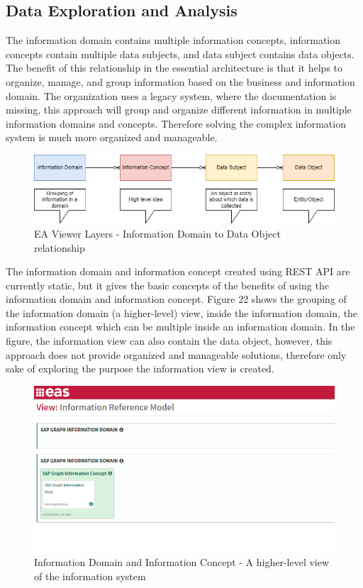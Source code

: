 \documentclass{article}
\begin{document}
\subsection{Data Exploration and Analysis}

The information domain contains multiple information concepts, information concepts contain multiple data subjects, and data subject contains data objects. The benefit of this relationship in the essential architecture is that it helps to organize, manage, and group information based on the business and information domain. The organization uses a legacy system, where the documentation is missing, this approach will group and organize different information in multiple information domains and concepts. Therefore solving the complex information system is much more organized and manageable.

\begin{figure}[ht!]
    \centering
    \includegraphics[scale=0.45]{ea-vis.drawio}
    \caption{EA Viewer Layers  - 
Information Domain to Data Object relationship }
    \label{fig:ea-vis}
\end{figure}

The information domain and information concept created using REST API are currently static, but it gives the basic concepts of the benefits of using the information domain and information concept. Figure 22 shows the grouping of the information domain (a higher-level) view, inside the information domain, the information concept which can be multiple inside an information domain. In the figure, the information view can also contain the data object, however, this approach does not provide organized and manageable solutions, therefore only sake of exploring the purpose the information view is created.

\begin{figure}[ht!]
    \centering
    \includegraphics[scale=0.55]{information-d-andc}
    \caption{Information Domain and Information Concept  - 
A higher-level view of the information system }
    \label{fig:information-domain-and-concept}
\end{figure}
\end{document}
